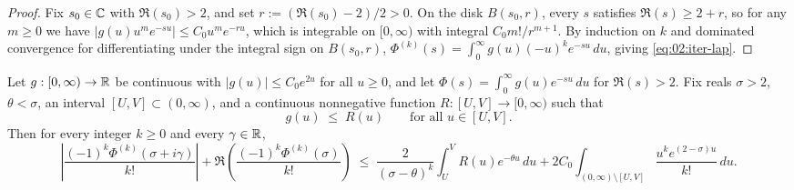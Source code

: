 \begin{proof}
Fix $s_0 \in \mathbb{C}$ with $\Re(s_0) > 2$, and set $r := (\Re(s_0) - 2)/2 > 0$. On the disk $B(s_0, r)$, every $s$ satisfies $\Re(s) \ge 2 + r$, so for any $m \ge 0$ we have $|g(u) u^m e^{-su}| \le C_0 u^m e^{-ru}$, which is integrable on $[0, \infty)$ with integral $C_0 m! / r^{m+1}$. By induction on $k$ and dominated convergence for differentiating under the integral sign on $B(s_0, r)$, $\Phi^{(k)}(s) = \int_0^\infty g(u)(-u)^k e^{-su}\,du$, giving \eqref{eq:02:iter-lap}.
\end{proof}

\begin{proposition}
\label{prop:02:window-ineq}
Let $g : [0, \infty) \to \mathbb{R}$ be continuous with $|g(u)| \le C_0 e^{2u}$ for all $u \ge 0$, and let $\Phi(s) = \int_0^\infty g(u) e^{-su}\,du$ for $\Re(s) > 2$. Fix reals $\sigma > 2$, $\theta < \sigma$, an interval $[U, V] \subset (0, \infty)$, and a continuous nonnegative function $R : [U, V] \to [0, \infty)$ such that
\[
  g(u) \;\le\; R(u) \qquad \text{for all } u \in [U, V].
\]
Then for every integer $k \ge 0$ and every $\gamma \in \mathbb{R}$,
\begin{equation}
\label{eq:02:window-core}
  \left|\frac{(-1)^k \Phi^{(k)}(\sigma + i\gamma)}{k!}\right|
  + \Re\!\left(\frac{(-1)^k \Phi^{(k)}(\sigma)}{k!}\right)
  \;\le\; \frac{2}{(\sigma - \theta)^k}\int_U^V R(u) e^{-\theta u}\,du
  + 2 C_0 \int_{(0,\infty) \setminus [U,V]} \frac{u^k e^{(2-\sigma)u}}{k!}\,du.
\end{equation}
\end{proposition}

